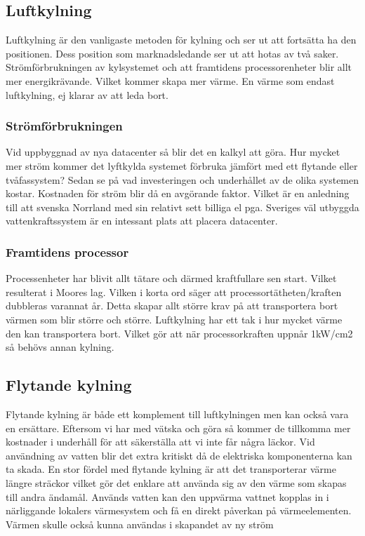 \documentclass[conference,a4paper]{IEEEtran}
\begin{document}
\subsection{Luftkylning} 
Luftkylning är den vanligaste metoden för kylning och ser ut att fortsätta ha den positionen. Dess position som marknadsledande
ser ut att hotas av två saker. Strömförbrukningen av kylsystemet och att framtidens processorenheter blir allt mer energikrävande.
Vilket kommer skapa mer värme. En värme som endast luftkylning, ej klarar av att leda bort. 
\subsubsection{Strömförbrukningen}
Vid uppbyggnad av nya datacenter så blir det en kalkyl att göra. Hur mycket mer ström kommer det lyftkylda systemet 
förbruka jämfört med ett flytande eller tvåfassystem? Sedan se på vad investeringen och underhållet av de olika systemen kostar. 
Kostnaden för ström blir då en avgörande faktor. Vilket är en anledning till att svenska Norrland med sin relativt sett billiga el pga. 
Sveriges väl utbyggda vattenkraftssystem är en intessant plats att placera datacenter. 
\subsubsection{Framtidens processor}
Processenheter har blivit allt tätare och därmed kraftfullare sen start. Vilket resulterat i Moores lag. Vilken i korta ord säger 
att processortätheten/kraften dubbleras varannat år. Detta skapar allt större krav på att transportera bort värmen som blir större och 
större. Luftkylning har ett tak i hur mycket värme den kan transportera bort. Vilket gör att när processorkraften uppnår 1kW/cm2
så behövs annan kylning.
\subsection{Flytande kylning}
Flytande kylning är både ett komplement till luftkylningen men kan också vara en ersättare. Eftersom vi har med vätska och göra så 
kommer de tillkomma mer kostnader i underhåll för att säkerställa att vi inte får några läckor. Vid användning av vatten blir det extra
kritiskt då de elektriska komponenterna kan ta skada. En stor fördel med flytande kylning är att det transporterar värme längre sträckor vilket gör det
enklare att använda sig av den värme som skapas till andra ändamål. Används vatten kan den uppvärma vattnet kopplas in i närliggande lokalers
värmesystem och få en direkt påverkan på värmeelementen. Värmen skulle också kunna användas i skapandet av ny ström \cite{energycompare2}  
\end{document}
